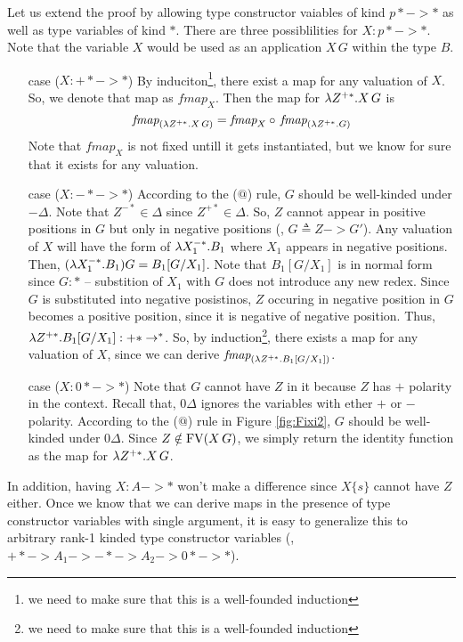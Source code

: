 Let us extend the proof by allowing type constructor vaiables of
kind $p* -> *$ as well as type variables of kind $*$. There are three
possiblilities for $X:p* -> *$. Note that the variable
$X$ would be used as an application $X\,G$ within the type $B$.
\begin{itemize}
\item[case]($X : +* -> *$)
	By induciton\footnote{
		we need to make sure that this is a well-founded induction},
	there exist a map for any valuation of $X$.
	So, we denote that map as $\textit{fmap}_{X}$.
	Then the map for $\lambda Z^{+*}.X\,G$ is
	\[ \textit{fmap}_{(\lambda Z^{+*}.X\,G)} =
		\textit{fmap}_{X} \circ\, \textit{fmap}_{(\lambda Z^{+*}.G)} \]
	Note that $\textit{fmap}_{X}$ is not fixed untill it gets
	instantiated, but we know for sure that it exists for any
	valuation.

\item[case]($X : -* -> *$)
	According to the ($@$) rule, $G$ should be well-kinded under $-\Delta$.
	Note that $Z^{-*}\in\Delta$ since $Z^{+*}\in \Delta$.
	So, $Z$ cannot appear in positive positions in $G$ but only in
	negative positions (\eg, $G \triangleq Z -> G'$).
	Any valuation of $X$ will have the form of $\lambda X_1^{-*}.B_1$
	where $X_1$ appears in negative positions.
	Then, $(\lambda X_1^{-*}.B_1)G = B_1[G/X_1]$. Note that $B_1[G/X_1]$
	is in normal form since $G:*$ -- substition of $X_1$ with $G$
	does not introduce any new redex. Since $G$ is substituted into
	negative posistinos, $Z$ occuring in negative position in $G$
	becomes a positive position, since it is negative of negative
	position. Thus, $\lambda Z^{+*}.B_1[G/X_1] : +* ->*$.
	So, by induction\footnote{
		we need to make sure that this is a well-founded induction},
	there exists a map for any valuation of $X$,
	since we can derive $\textit{fmap}_{(\lambda Z^{+*}.B_1[G/X_1])}$.

\item[case]($X : 0* -> *$)
	Note that $G$ cannot have $Z$ in it because $Z$ has $+$ polarity
	in the context. Recall that, $0\Delta$ ignores the variables
	with ether $+$ or $-$ polarity. According to the ($@$) rule
	in Figure \ref{fig:Fixi2}, $G$ should be well-kinded under $0\Delta$.
	Since $Z\notin\mathop{\mathrm{FV}}(X\,G)$, we simply return the identity function
	as the map for $\lambda Z^{+*}.X\,G$.
\end{itemize}
In addition, having $X : A -> *$ won't make a difference since $X\{s\}$
cannot have $Z$ either. Once we know that we can derive maps in the presence
of type constructor variables with single argument, it is easy to generalize
this to arbitrary rank-1 kinded type constructor variables
(\eg, $+* -> A_1 -> -* -> A_2 -> 0* -> *$).



